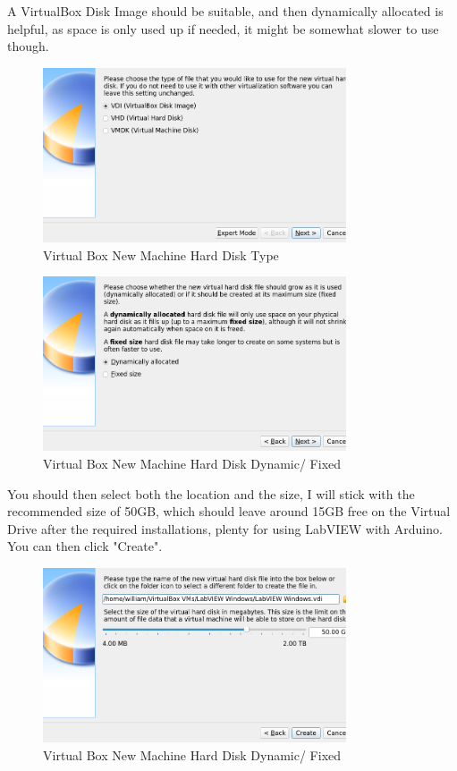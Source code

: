 \documentclass[a4paper,11pt]{report}
\begin{document}
A VirtualBox Disk Image should be suitable, and then dynamically allocated is helpful, as space is only used up if needed, it might be somewhat slower to use though.

\begin{figure}[H]
\centering
\includegraphics[width=0.8\textwidth]{screenshots/virtualboxharddiskvdi}
\caption{Virtual Box New Machine Hard Disk Type}
\end{figure}

\begin{figure}[H]
\centering
\includegraphics[width=0.8\textwidth]{screenshots/virtualboxharddiskdynamic}
\caption{Virtual Box New Machine Hard Disk Dynamic/ Fixed}
\end{figure}

You should then select both the location and the size, I will stick with the recommended size of 50GB, which should leave around 15GB free on the Virtual Drive after the required installations, plenty for using LabVIEW with Arduino. You can then click "Create".

\begin{figure}[H]
\centering
\includegraphics[width=0.8\textwidth]{screenshots/virtualboxharddisksize}
\caption{Virtual Box New Machine Hard Disk Dynamic/ Fixed}
\end{figure}
\end{document}
